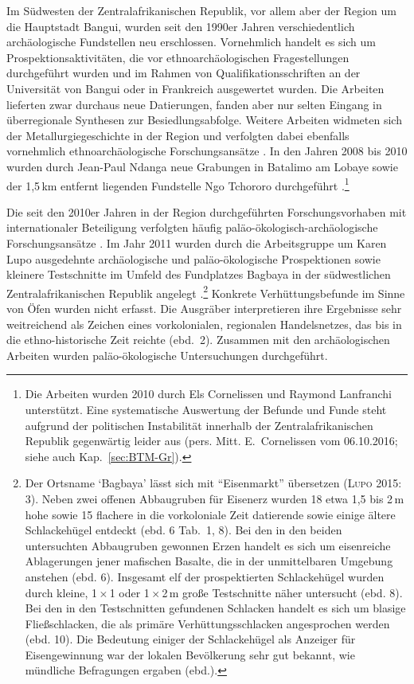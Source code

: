 \begin{multicols}{2}
Im Südwesten der Zentralafrikanischen Republik, vor allem aber der Region um die Hauptstadt Bangui, wurden seit den 1990er Jahren verschiedentlich archäologische Fundstellen neu erschlossen. Vornehmlich handelt es sich um Prospektionsaktivitäten, die vor ethnoarchäologischen Fragestellungen durchgeführt wurden und im Rahmen von Qualifikationsschriften an der Universität von Bangui \parencites{Ndanga.199596}{Abrou.199697} oder in Frankreich \parencites{Kote.1992}{Scouflaire.1997} ausgewertet wurden. Die Arbeiten lieferten zwar durchaus neue Datierungen, fanden aber nur selten Eingang in überregionale Synthesen zur Besiedlungsabfolge. Weitere Arbeiten widmeten sich der Metallurgiegeschichte in der Region und verfolgten dabei ebenfalls vornehmlich ethnoarchäologische Forschungsansätze \parencites{Muramira.20042005}{Muramira.20052006}{Moga.2008}. In den Jahren 2008 bis 2010 wurden durch Jean-Paul Ndanga neue Grabungen in Batalimo am Lobaye sowie der 1,5\,km entfernt liegenden Fundstelle Ngo Tchororo durchgeführt \parencite{Ndanga.2010}.\footnote{Die Arbeiten wurden 2010 durch Els Cornelissen und Raymond Lanfranchi unterstützt. Eine systematische Auswertung der Befunde und Funde steht aufgrund der politischen Instabilität innerhalb der Zentralafrikanischen Republik gegenwärtig leider aus (pers. Mitt. E.~Cornelissen vom 06.10.2016; siehe auch Kap.~\ref{sec:BTM-Gr}).}

Die seit den 2010er Jahren in der Region durchgeführten Forschungsvorhaben mit internationaler Beteiligung verfolgten häufig paläo-ökologisch-archäologische Forschungsansätze \parencites[siehe][]{Kiahtipes.2011}{Gillet.2013}{MorinRivat.2014}{Kiahtipes.2016}. Im Jahr 2011 wurden durch die Arbeitsgruppe um Karen Lupo ausgedehnte archäologische und paläo-ökologische Prospektionen sowie kleinere Testschnitte im Umfeld des Fundplatzes Bagbaya in der südwestlichen Zentralafrikanischen Republik angelegt \parencite{Lupo.2015}.\footnote{Der Ortsname \enquote*{Bagbaya} lässt sich mit \enquote{Eisenmarkt} übersetzen (\textsc{Lupo} 2015: 3). Neben zwei offenen Abbaugruben für Eisenerz wurden 18 etwa 1,5 bis 2\,m hohe sowie 15 flachere in die vorkoloniale Zeit datierende sowie einige ältere Schlackehügel entdeckt (ebd. 6 Tab.~1, 8). Bei den in den beiden untersuchten Abbaugruben gewonnen Erzen handelt es sich um eisenreiche Ablagerungen jener mafischen Basalte, die in der unmittelbaren Umgebung anstehen (ebd. 6). Insgesamt elf der prospektierten Schlackehügel wurden durch kleine, 1\,$\times$\,1 oder 1\,$\times$\,2\,m große Testschnitte näher untersucht (ebd. 8). Bei den in den Testschnitten gefundenen Schlacken handelt es sich um blasige Fließschlacken, die als primäre Verhüttungsschlacken angesprochen werden (ebd. 10). Die Bedeutung einiger der Schlackehügel als Anzeiger für Eisengewinnung war der lokalen Bevölkerung sehr gut bekannt, wie mündliche Befragungen ergaben (ebd.).} Konkrete Verhüttungsbefunde im Sinne von Öfen wurden nicht erfasst. Die Ausgräber interpretieren ihre Ergebnisse sehr weitreichend als Zeichen eines vorkolonialen, regionalen Handelsnetzes, das bis in die ethno-historische Zeit reichte (ebd.~2). Zusammen mit den archäologischen Arbeiten wurden paläo-ökologische Untersuchungen durchgeführt.


\end{multicols}
